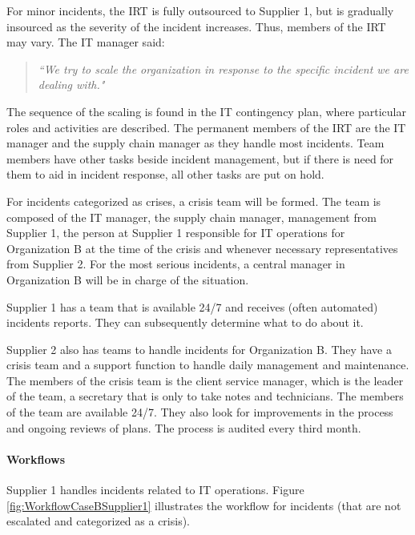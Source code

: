 \documentclass[b5paper, twoside, openright, 11pt]{report}
\begin{document}
For minor incidents, the \ac{IRT} is fully outsourced to Supplier 1, but is gradually insourced as the severity of the incident increases. Thus, members of the \ac{IRT} may vary. The IT manager said:

\begin{quote}
\textit{``We try to scale the organization in response to the specific incident we are dealing with."}
\end{quote}

The sequence of the scaling is found in the IT contingency plan, where particular roles and activities are described. The permanent members of the \ac{IRT} are the IT manager and the supply chain manager as they handle most incidents. Team members have other tasks beside incident management, but if there is need for them to aid in incident response, all other tasks are put on hold.

For incidents categorized as crises, a crisis team will be formed. The team is composed of the IT manager, the supply chain manager, management from Supplier 1, the person at Supplier 1 responsible for IT operations for Organization B at the time of the crisis and whenever necessary representatives from Supplier 2. For the most serious incidents, a central manager in Organization B will be in charge of the situation.

Supplier 1 has a team that is available 24/7 and receives (often automated) incidents reports. They can subsequently determine what to do about it.

Supplier 2 also has teams to handle incidents for Organization B. They have a crisis team and a support function to handle daily management and maintenance. The members of the crisis team is the client service manager, which is the leader of the team, a secretary that is only to take notes and technicians. The members of the team are available 24/7. They also look for improvements in the process and ongoing reviews of plans. The process is audited every third month.

\paragraph{Workflows}

Supplier 1 handles incidents related to IT operations. Figure \ref{fig:WorkflowCaseBSupplier1} illustrates the workflow for incidents (that are not escalated and categorized as a crisis).
\end{document}
